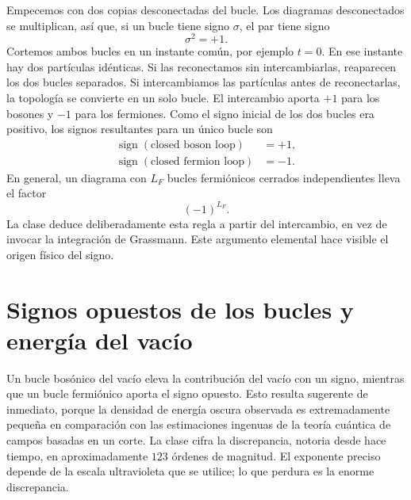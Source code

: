 Empecemos con dos copias desconectadas del bucle. Los diagramas desconectados se multiplican, así que, si un bucle tiene signo \(\sigma\), el par tiene signo
\begin{equation}
\sigma^2=+1.
\end{equation}
Cortemos ambos bucles en un instante común, por ejemplo \(t=0\). En ese instante hay dos partículas idénticas. Si las reconectamos sin intercambiarlas, reaparecen los dos bucles separados. Si intercambiamos las partículas antes de reconectarlas, la topología se convierte en un solo bucle. El intercambio aporta \(+1\) para los bosones y \(-1\) para los fermiones. Como el signo inicial de los dos bucles era positivo, los signos resultantes para un único bucle son
\begin{equation}
\begin{aligned}
\operatorname{sign}(\text{closed boson loop})&=+1,\\
\operatorname{sign}(\text{closed fermion loop})&=-1.
\end{aligned}
\end{equation}
En general, un diagrama con \(L_F\) bucles fermiónicos cerrados independientes lleva el factor
\begin{equation}
(-1)^{L_F}.
\end{equation}
La clase deduce deliberadamente esta regla a partir del intercambio, en vez de invocar la integración de Grassmann. Este argumento elemental hace visible el origen físico del signo.

\section{Signos opuestos de los bucles y energía del vacío}

Un bucle bosónico del vacío eleva la contribución del vacío con un signo, mientras que un bucle fermiónico aporta el signo opuesto. Esto resulta sugerente de inmediato, porque la densidad de energía oscura observada es extremadamente pequeña en comparación con las estimaciones ingenuas de la teoría cuántica de campos basadas en un corte. La clase cifra la discrepancia, notoria desde hace tiempo, en aproximadamente \(123\) órdenes de magnitud. El exponente preciso depende de la escala ultravioleta que se utilice; lo que perdura es la enorme discrepancia.

